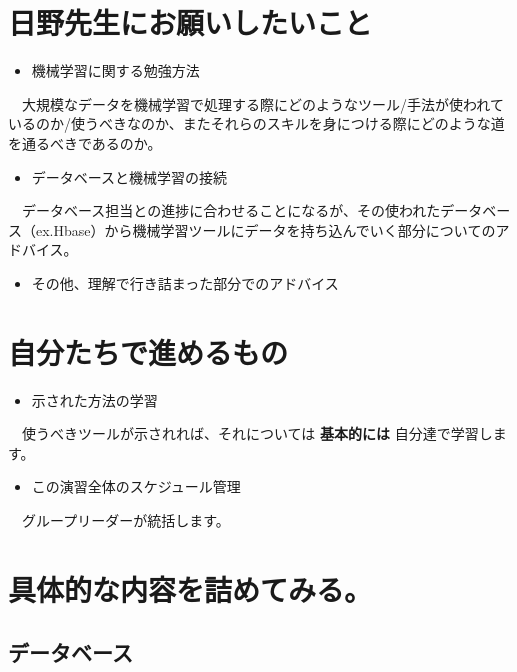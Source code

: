 \documentclass{scrartcl}
\begin{document}
\section{日野先生にお願いしたいこと}
\label{sec:org3c23749}
\begin{itemize}
\item 機械学習に関する勉強方法\\
\end{itemize}
　大規模なデータを機械学習で処理する際にどのようなツール/手法が使われているのか/使うべきなのか、またそれらのスキルを身につける際にどのような道を通るべきであるのか。\\
\begin{itemize}
\item データベースと機械学習の接続\\
\end{itemize}
　データベース担当との進捗に合わせることになるが、その使われたデータベース（ex.Hbase）から機械学習ツールにデータを持ち込んでいく部分についてのアドバイス。\\
\begin{itemize}
\item その他、理解で行き詰まった部分でのアドバイス\\
\end{itemize}
\section{自分たちで進めるもの}
\label{sec:orgae55919}
\begin{itemize}
\item 示された方法の学習\\
\end{itemize}
　使うべきツールが示されれば、それについては \textbf{基本的には} 自分達で学習します。\\
\begin{itemize}
\item この演習全体のスケジュール管理\\
\end{itemize}
　グループリーダーが統括します。\\
\section{具体的な内容を詰めてみる。}
\label{sec:orga3648c8}
\subsection{データベース}
\label{sec:org94125cb}
\end{document}
